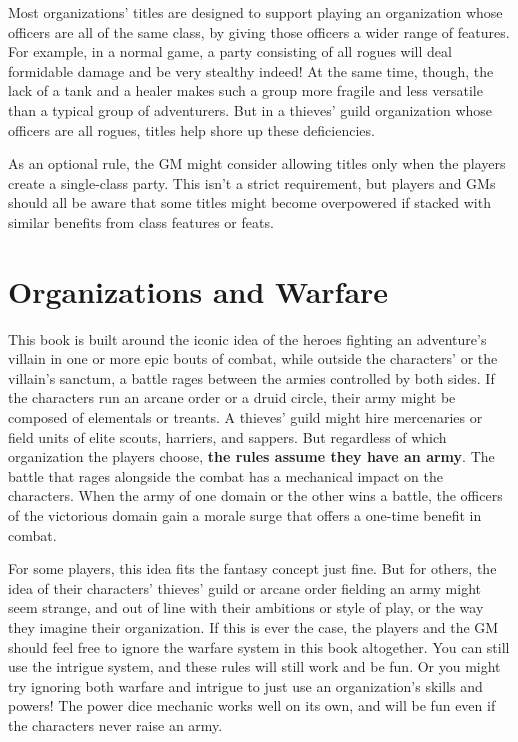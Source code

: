 \documentclass[10pt,a4paper,twoside,bg=print,twocolumn,openany,nodeprecatedcode]{dndbook}
\begin{document}
Most organizations' titles are designed to support playing an organization whose officers are all of the same class, by giving those officers a wider range of features. For example, in a normal game, a party consisting of all rogues will deal formidable damage and be very stealthy indeed! At the same time, though, the lack of a tank and a healer makes such a group more fragile and less versatile than a typical group of adventurers. But in a thieves' guild organization whose officers are all rogues, titles help shore up these deficiencies.

As an optional rule, the GM might consider allowing titles only when the players create a single-class party. This isn't a strict requirement, but players and GMs should all be aware that some titles might become overpowered if stacked with similar benefits from class features or feats.

\section{Organizations and Warfare}
This book is built around the iconic idea of the heroes fighting an adventure's villain in one or more epic bouts of combat, while outside the characters' or the villain's sanctum, a battle rages between the armies controlled by both sides. If the characters run an arcane order or a druid circle, their army might be composed of elementals or treants. A thieves' guild might hire mercenaries or field units of elite scouts, harriers, and sappers. But regardless of which organization the players choose, \textbf{the rules assume they have an army}. The battle that rages alongside the combat has a mechanical impact on the characters. When the army of one domain or the other wins a battle, the officers of the victorious domain gain a morale surge that offers a one-time benefit in combat.

For some players, this idea fits the fantasy concept just fine. But for others, the idea of their characters' thieves' guild or arcane order fielding an army might seem strange, and out of line with their ambitions or style of play, or the way they imagine their organization. If this is ever the case, the players and the GM should feel free to ignore the warfare system in this book altogether. You can still use the intrigue system, and these rules will still work and be fun. Or you might try ignoring both warfare and intrigue to just use an organization's skills and powers! The power dice mechanic works well on its own, and will be fun even if the characters never raise an army.
\end{document}
